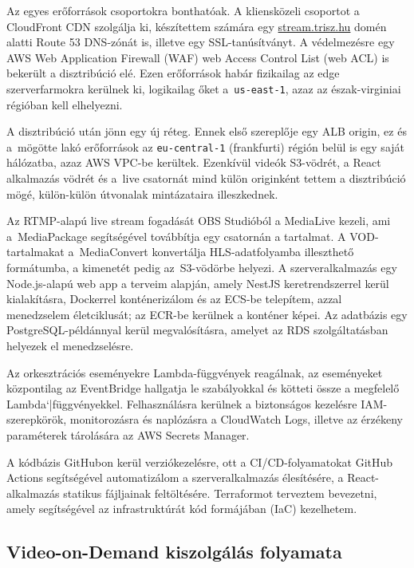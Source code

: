 Az egyes erőforrások csoportokra bonthatóak. A kliensközeli csoportot a CloudFront CDN szolgálja ki, készítettem számára egy \url{stream.trisz.hu} domén alatti Route 53 DNS\leavevmode\hbox{-}zónát is, illetve egy SSL-tanúsítványt. A védelmezésre egy AWS Web Application Firewall (WAF) web Access Control List (web ACL) is bekerült a disztribúció elé. Ezen erőforrások habár fizikailag az edge szerverfarmokra kerülnek ki, logikailag őket a~\verb|us-east-1|, azaz az észak-virginiai régióban kell elhelyezni.

A disztribúció után jönn egy új réteg. Ennek első szereplője egy ALB origin, ez és a~mögötte lakó erőforrások az \verb|eu-central-1| (frankfurti) régión belül is egy saját hálózatba, azaz AWS VPC-be kerültek. Ezenkívül videók S3-vödrét, a React alkalmazás vödrét és a~live csatornát mind külön originként tettem a disztribúció mögé, külön-külön útvonalak mintázataira illeszkednek.

Az RTMP-alapú live stream fogadását OBS Studióból a MediaLive kezeli, ami a~MediaPackage segítségével továbbítja egy csatornán a tartalmat. A VOD-tartalmakat a~MediaConvert konvertálja HLS-adatfolyamba illeszthető formátumba, a kimenetét pedig az~S3\leavevmode\hbox{-}vödörbe helyezi. A szerveralkalmazás egy Node.js-alapú web app a terveim alapján, amely NestJS keretrendszerrel kerül kialakításra, Dockerrel konténerizálom és az ECS-be telepítem, azzal menedzselem életciklusát; az ECR-be kerülnek a konténer képei. Az adatbázis egy PostgreSQL-példánnyal kerül megvalósításra, amelyet az RDS szolgáltatásban helyezek el menedzselésre.

Az orkesztrációs eseményekre Lambda-függvények reagálnak, az eseményeket központilag az EventBridge hallgatja le szabályokkal és kötteti össze a megfelelő Lambda`|függvényekkel. Felhasználásra kerülnek a biztonságos kezelésre IAM-szerepkörök, monitorozásra és naplózásra a CloudWatch Logs, illetve az érzékeny paraméterek tárolására az AWS Secrets Manager.

A kódbázis GitHubon kerül verziókezelésre, ott a CI/CD-folyamatokat GitHub Actions segítségével automatizálom a szerveralkalmazás élesítésére, a React-alkalmazás statikus fájljainak feltöltésére. Terraformot terveztem bevezetni, amely segítségével az infrastruktúrát kód formájában (IaC) kezelhetem.\cite{iac}

\subsection{Video-on-Demand kiszolgálás folyamata}

